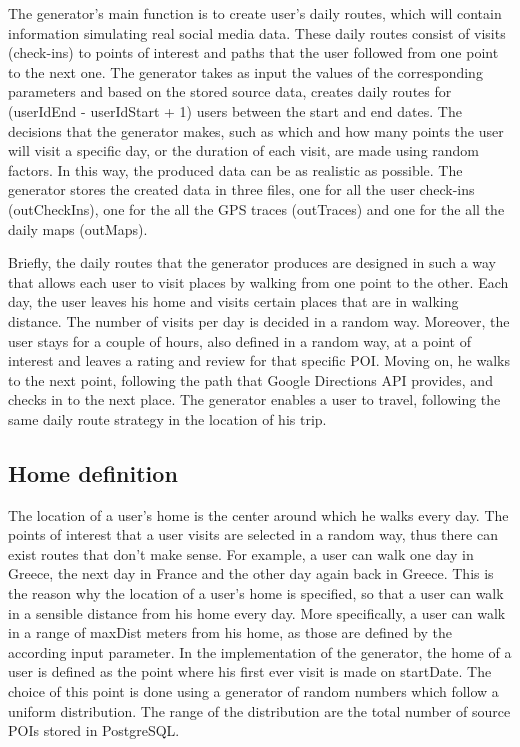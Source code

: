 The generator's main function is to create user's daily routes, which will contain information simulating real social media data. These daily routes 
consist of visits (check-ins) to points of interest and paths that the user followed from one point to the next one. The generator takes as input the 
values of the corresponding parameters and based on the stored source data, creates daily routes for (userIdEnd - userIdStart + 1) users between 
the start and end dates. The decisions that the generator makes, such as which and how many points the user will visit a specific day, or the duration 
of each visit, are made using random factors. In this way, the produced data can be as realistic as possible. The generator stores the created data in three files, 
one for all the user check-ins (outCheckIns), one for the all the GPS traces (outTraces) and one for the all the daily maps (outMaps).

Briefly, the daily routes that the generator produces are designed in such a way that allows each user to visit places by walking from one point to the other. 
Each day, the user leaves his home and visits certain places that are in walking distance. The number of visits per day is decided in a random way. Moreover, 
the user stays for a couple of hours, also defined in a random way, at a point of interest and leaves a rating and review for that specific POI. Moving on, he walks 
to the next point, following the path that Google Directions API provides, and checks in to the next place. The generator enables a user to travel, following the 
same daily route strategy in the location of his trip.


\subsection{Home definition}

The location of a user's home is the center around which he walks every day. The points of interest that a user visits are selected in a random way, thus there can 
exist routes that don't make sense. For example, a user can walk one day in Greece, the next day in France and the other day again back in Greece. This is the reason 
why the location of a user's home is specified, so that a user can walk in a sensible distance from his home every day. More specifically, a user can walk in a range 
of maxDist meters from his home, as those are defined by the according input parameter. In the implementation of the generator, the home of a user is defined as 
the point where his first ever visit is made on startDate. The choice of this point is done using a generator of random numbers which follow a uniform distribution. 
The range of the distribution are the total number of source POIs stored in PostgreSQL.

